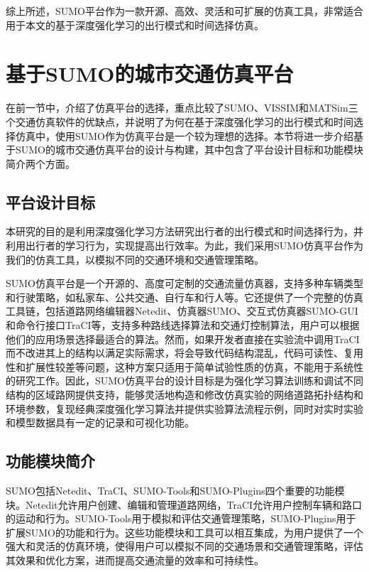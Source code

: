 综上所述，SUMO平台作为一款开源、高效、灵活和可扩展的仿真工具，非常适合用于本文的基于深度强化学习的出行模式和时间选择仿真。


\section{基于SUMO的城市交通仿真平台}
\label{section:3.2}

在前一节中，介绍了仿真平台的选择，重点比较了SUMO、VISSIM和MATSim三个交通仿真软件的优缺点，并说明了为何在基于深度强化学习的出行模式和时间选择仿真中，使用SUMO作为仿真平台是一个较为理想的选择。本节将进一步介绍基于SUMO的城市交通仿真平台的设计与构建，其中包含了平台设计目标和功能模块简介两个方面。

\subsection{平台设计目标}


本研究的目的是利用深度强化学习方法研究出行者的出行模式和时间选择行为，并利用出行者的学习行为，实现提高出行效率。为此，我们采用SUMO仿真平台作为我们的仿真工具，以模拟不同的交通环境和交通管理策略。

SUMO仿真平台是一个开源的、高度可定制的交通流量仿真器，支持多种车辆类型和行驶策略，如私家车、公共交通、自行车和行人等。它还提供了一个完整的仿真工具链，包括道路网络编辑器Netedit、仿真器SUMO、交互式仿真器SUMO-GUI和命令行接口TraCI等，支持多种路线选择算法和交通灯控制算法，用户可以根据他们的应用场景选择最适合的算法。然而，如果开发者直接在实验流中调用TraCI而不改进其上的结构以满足实际需求，将会导致代码结构混乱，代码可读性、复用性和扩展性较差等问题，这种方案只适用于简单试验性质的仿真，不能用于系统性的研究工作。因此，SUMO仿真平台的设计目标是为强化学习算法训练和调试不同结构的区域路网提供支持，能够灵活地构造和修改仿真实验的网络道路拓扑结构和环境参数，复现经典深度强化学习算法并提供实验算法流程示例，同时对实时实验和模型数据具有一定的记录和可视化功能。
 

\subsection{功能模块简介}
SUMO包括Netedit、TraCI、SUMO-Tools和SUMO-Plugins四个重要的功能模块。Netedit允许用户创建、编辑和管理道路网络，TraCI允许用户控制车辆和路口的运动和行为。SUMO-Tools用于模拟和评估交通管理策略，SUMO-Plugins用于扩展SUMO的功能和行为。这些功能模块和工具可以相互集成，为用户提供了一个强大和灵活的仿真环境，使得用户可以模拟不同的交通场景和交通管理策略，评估其效果和优化方案，进而提高交通流量的效率和可持续性。

